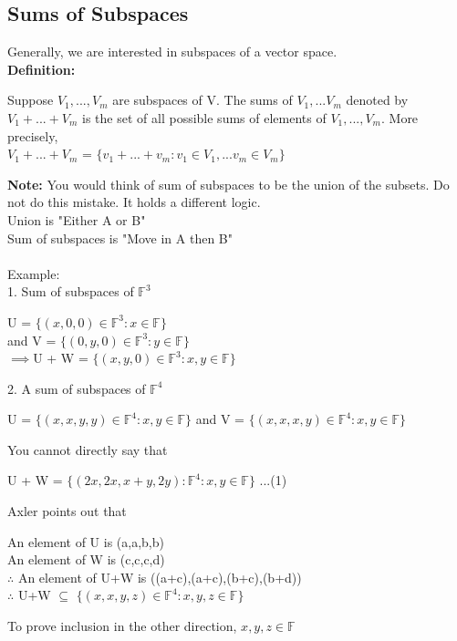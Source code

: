 \documentclass{article}
\begin{document}
\subsection{Sums of Subspaces}
Generally, we are interested in subspaces of a vector space. \\ 
\textbf{Definition:} 
\begin{center}
    Suppose $V_1,..., V_m$ are subspaces of V. The sums of $V_1,...V_m$ denoted by $V_1+...+ V_m$ is the set of all possible sums of elements of $V_1,..., V_m$. More precisely, \\
    $V_1+...+ V_m$ = $\{v_1+...+ v_m:v_1 \in V_1,...v_m \in V_m \}$
\end{center}
\textbf{Note:} You would think of sum of subspaces to be the union of the subsets. Do not do this mistake. It holds a different logic. \\
Union is "Either A or B" \\
Sum of subspaces is "Move in A then B" \\
\\
Example: \\
1. Sum of subspaces of $\mathbb{F}^3$ \\
\begin{center}
    U = $\{(x,0,0) \in \mathbb{F}^3 : x \in \mathbb{F}\}$ \\
    and V = $\{(0,y,0) \in \mathbb{F}^3 : y \in \mathbb{F}\}$ \\ 
    $\implies$U + W = $\{(x,y,0) \in \mathbb{F}^3 : x,y \in \mathbb{F}\}$
\end{center}    
2. A sum of subspaces of $\mathbb{F}^4$ 
\begin{center}
    U = $\{(x,x,y,y) \in \mathbb{F}^4: x,y \in \mathbb{F}\}$ and V = $\{(x,x,x,y) \in \mathbb{F}^4 : x,y \in \mathbb{F}\}$ 
\end{center}
You cannot directly say that 
\begin{center}
    U + W = $\{(2x,2x,x+y,2y):\mathbb{F}^4 : x,y \in \mathbb{F}\}$        ...(1)
\end{center}
Axler points out that 
\begin{center}
    An element of U is (a,a,b,b) \\
    An element of W is (c,c,c,d) \\
    $\therefore$ An element of U+W is ((a+c),(a+c),(b+c),(b+d)) \\
    $\therefore$ U+W $\subseteq$ $\{(x,x,y,z)\in \mathbb{F}^4: x,y,z \in \mathbb{F}\}$
\end{center}
To prove inclusion in the other direction, $x,y,z \in \mathbb{F}$ 
\end{document}
